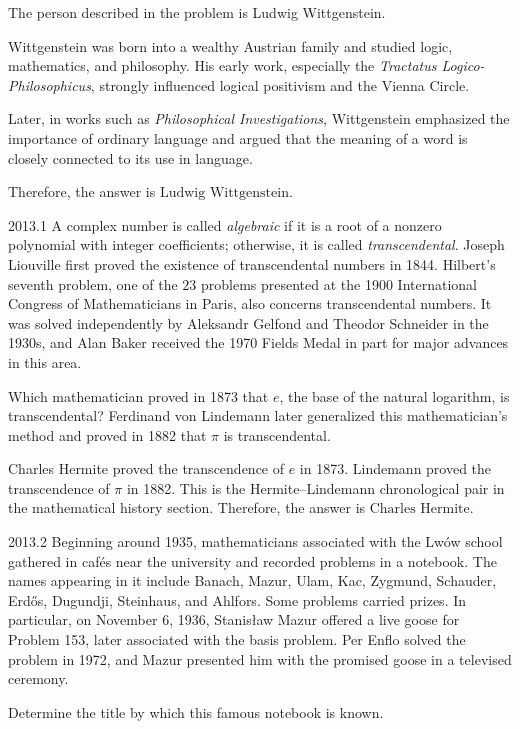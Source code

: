     \begin{solution}
        The person described in the problem is Ludwig Wittgenstein.

        Wittgenstein was born into a wealthy Austrian family and studied logic, mathematics, and
        philosophy. His early work, especially the \textit{Tractatus Logico-Philosophicus}, strongly
        influenced logical positivism and the Vienna Circle.

        Later, in works such as \textit{Philosophical Investigations}, Wittgenstein emphasized the
        importance of ordinary language and argued that the meaning of a word is closely connected
        to its use in language.

        Therefore, the answer is $\boxed{\text{Ludwig Wittgenstein}}$.
    \end{solution}

    \begin{pastproblem}{2013.1}
        A complex number is called \emph{algebraic} if it is a root of a nonzero polynomial with
        integer coefficients; otherwise, it is called \emph{transcendental}. Joseph Liouville first
        proved the existence of transcendental numbers in 1844. Hilbert's seventh problem, one of
        the $23$ problems presented at the 1900 International Congress of Mathematicians in Paris,
        also concerns transcendental numbers. It was solved independently by Aleksandr Gelfond and
        Theodor Schneider in the 1930s, and Alan Baker received the 1970 Fields Medal in part for
        major advances in this area.

        Which mathematician proved in 1873 that $e$, the base of the natural logarithm, is
        transcendental? Ferdinand von Lindemann later generalized this mathematician's method and
        proved in 1882 that $\pi$ is transcendental.
    \end{pastproblem}

    \begin{solution}
Charles Hermite proved the transcendence of $e$ in 1873.
        Lindemann proved the transcendence of $\pi$ in 1882. This is the
        Hermite--Lindemann chronological pair in the mathematical history section.
        Therefore, the answer is $\boxed{\text{Charles Hermite}}$.
    \end{solution}

    \begin{pastproblem}{2013.2}
        Beginning around 1935, mathematicians associated with the Lw\'ow school gathered in cafés
        near the university and recorded problems in a notebook. The names appearing in it include
        Banach, Mazur, Ulam, Kac, Zygmund, Schauder, Erd\H{o}s, Dugundji, Steinhaus, and Ahlfors.
        Some problems carried prizes. In particular, on November 6, 1936, Stanis{\l}aw Mazur offered a
        live goose for Problem 153, later associated with the basis problem. Per Enflo solved the
        problem in 1972, and Mazur presented him with the promised goose in a televised ceremony.

        Determine the title by which this famous notebook is known.
    \end{pastproblem}

